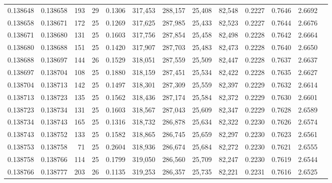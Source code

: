 \begin{tabular}{rrrrrrrrrrrrr}
0.138648 & 0.138658 &   193 &  29 &                                     0.1306 & 317,453 & 288,157 &  25,408 &  82,548 & 0.2227 & 0.7646 & 2.6692 \\
0.138658 & 0.138671 &   172 &  25 &                                     0.1269 & 317,625 & 287,985 &  25,433 &  82,523 & 0.2227 & 0.7644 & 2.6676 \\
0.138671 & 0.138680 &   131 &  25 &                                     0.1603 & 317,756 & 287,854 &  25,458 &  82,498 & 0.2228 & 0.7642 & 2.6664 \\
0.138680 & 0.138688 &   151 &  25 &                                     0.1420 & 317,907 & 287,703 &  25,483 &  82,473 & 0.2228 & 0.7640 & 2.6650 \\
0.138688 & 0.138697 &   144 &  26 &                                     0.1529 & 318,051 & 287,559 &  25,509 &  82,447 & 0.2228 & 0.7637 & 2.6637 \\
0.138697 & 0.138704 &   108 &  25 &                                     0.1880 & 318,159 & 287,451 &  25,534 &  82,422 & 0.2228 & 0.7635 & 2.6627 \\
0.138704 & 0.138713 &   142 &  25 &                                     0.1497 & 318,301 & 287,309 &  25,559 &  82,397 & 0.2229 & 0.7632 & 2.6614 \\
0.138713 & 0.138723 &   135 &  25 &                                     0.1562 & 318,436 & 287,174 &  25,584 &  82,372 & 0.2229 & 0.7630 & 2.6601 \\
0.138723 & 0.138734 &   131 &  25 &                                     0.1603 & 318,567 & 287,043 &  25,609 &  82,347 & 0.2229 & 0.7628 & 2.6589 \\
0.138734 & 0.138743 &   165 &  25 &                                     0.1316 & 318,732 & 286,878 &  25,634 &  82,322 & 0.2230 & 0.7626 & 2.6574 \\
0.138743 & 0.138752 &   133 &  25 &                                     0.1582 & 318,865 & 286,745 &  25,659 &  82,297 & 0.2230 & 0.7623 & 2.6561 \\
0.138753 & 0.138758 &    71 &  25 &                                     0.2604 & 318,936 & 286,674 &  25,684 &  82,272 & 0.2230 & 0.7621 & 2.6555 \\
0.138758 & 0.138766 &   114 &  25 &                                     0.1799 & 319,050 & 286,560 &  25,709 &  82,247 & 0.2230 & 0.7619 & 2.6544 \\
0.138766 & 0.138777 &   203 &  26 &                                     0.1135 & 319,253 & 286,357 &  25,735 &  82,221 & 0.2231 & 0.7616 & 2.6525 \\

\end{tabular}
